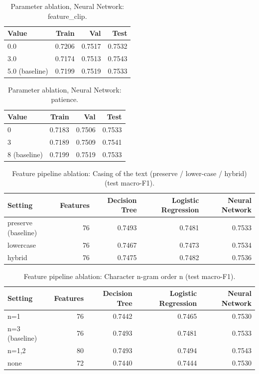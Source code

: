\begin{table}[ht]
\centering
\small
\caption{Parameter ablation, Neural Network: feature\_clip.}
\label{tab:ablation-neural-feature-clip}
\begin{tabular}{lrrr}
\toprule
Value & Train & Val & Test \\
\midrule
0.0 & 0.7206 & 0.7517 & 0.7532 \\
3.0 & 0.7174 & 0.7513 & 0.7543 \\
5.0 (baseline) & 0.7199 & 0.7519 & 0.7533 \\
\bottomrule
\end{tabular}
\end{table}

\begin{table}[ht]
\centering
\small
\caption{Parameter ablation, Neural Network: patience.}
\label{tab:ablation-neural-patience}
\begin{tabular}{lrrr}
\toprule
Value & Train & Val & Test \\
\midrule
0 & 0.7183 & 0.7506 & 0.7533 \\
3 & 0.7189 & 0.7509 & 0.7541 \\
8 (baseline) & 0.7199 & 0.7519 & 0.7533 \\
\bottomrule
\end{tabular}
\end{table}

\begin{table}[ht]
\centering
\small
\caption{Feature pipeline ablation: Casing of the text (preserve / lower-case / hybrid) (test macro-F1).}
\label{tab:pipeline-casing}
\begin{tabular}{lrrrr}
\toprule
Setting & Features & Decision Tree & Logistic Regression & Neural Network \\
\midrule
preserve (baseline) & 76 & 0.7493 & 0.7481 & 0.7533 \\
lowercase & 76 & 0.7467 & 0.7473 & 0.7534 \\
hybrid & 76 & 0.7475 & 0.7482 & 0.7536 \\
\bottomrule
\end{tabular}
\end{table}

\begin{table}[ht]
\centering
\small
\caption{Feature pipeline ablation: Character n-gram order n (test macro-F1).}
\label{tab:pipeline-char-n}
\begin{tabular}{lrrrr}
\toprule
Setting & Features & Decision Tree & Logistic Regression & Neural Network \\
\midrule
n=1 & 76 & 0.7442 & 0.7465 & 0.7530 \\
n=3 (baseline) & 76 & 0.7493 & 0.7481 & 0.7533 \\
n=1,2 & 80 & 0.7493 & 0.7494 & 0.7543 \\
none & 72 & 0.7440 & 0.7444 & 0.7530 \\
\bottomrule
\end{tabular}
\end{table}


